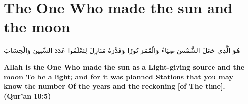 \chapter{The One Who made the sun and the moon}
\begin{center}
    {\Huge    
        \begin{Arabic}
            هُوَ الَّذِي جَعَلَ الشَّمْسَ ضِيَاءً وَالْقَمَرَ نُورًا وَقَدَّرَهُ مَنَازِلَ لِتَعْلَمُوا عَدَدَ السِّنِينَ وَالْحِسَابَ
        \end{Arabic}
    }    
\end{center}
\vspace*{\fill}
\vspace{3cm}
\begin{center}
    \large \textbf{Allāh is the One Who made the sun as a Light-giving source and the moon To be a light; and for it was planned Stations that you may know the number Of the years and the reckoning [of The time]. (Qur'an 10:5)}
\end{center}
